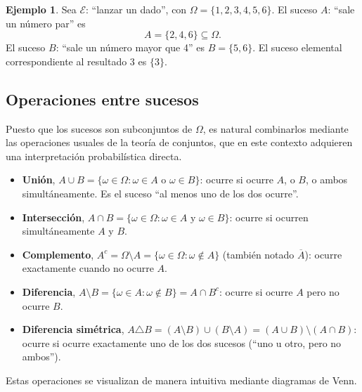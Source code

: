 \documentclass[11pt,a4paper]{article}
\theoremstyle{plain}
\theoremstyle{definition}
\newtheorem{ejemplo}[teorema]{Ejemplo}
\theoremstyle{remark}
\begin{document}
\begin{ejemplo}
Sea $\mathcal{E}$: ``lanzar un dado'', con $\Omega=\{1,2,3,4,5,6\}$. El suceso $A$: ``sale un número par'' es
\[
A = \{2,4,6\} \subseteq \Omega.
\]
El suceso $B$: ``sale un número mayor que 4'' es $B=\{5,6\}$. El suceso elemental correspondiente al resultado $3$ es $\{3\}$.
\end{ejemplo}

\subsection{Operaciones entre sucesos}

Puesto que los sucesos son subconjuntos de $\Omega$, es natural combinarlos mediante las operaciones usuales de la teoría de conjuntos, que en este contexto adquieren una interpretación probabilística directa.

\begin{itemize}[leftmargin=2em]
\item \textbf{Unión}, $A \cup B = \{\omega \in \Omega : \omega \in A \text{ o } \omega \in B\}$: ocurre si ocurre $A$, o $B$, o ambos simultáneamente. Es el suceso ``al menos uno de los dos ocurre''.
\item \textbf{Intersección}, $A \cap B = \{\omega \in \Omega : \omega \in A \text{ y } \omega \in B\}$: ocurre si ocurren simultáneamente $A$ y $B$.
\item \textbf{Complemento}, $A^c = \Omega \setminus A = \{\omega \in \Omega : \omega \notin A\}$ (también notado $\overline{A}$): ocurre exactamente cuando no ocurre $A$.
\item \textbf{Diferencia}, $A \setminus B = \{\omega \in A : \omega \notin B\} = A \cap B^c$: ocurre si ocurre $A$ pero no ocurre $B$.
\item \textbf{Diferencia simétrica}, $A \triangle B = (A\setminus B)\cup(B\setminus A) = (A\cup B)\setminus(A\cap B)$: ocurre si ocurre exactamente uno de los dos sucesos (``uno u otro, pero no ambos'').
\end{itemize}

Estas operaciones se visualizan de manera intuitiva mediante diagramas de Venn.
\end{document}
